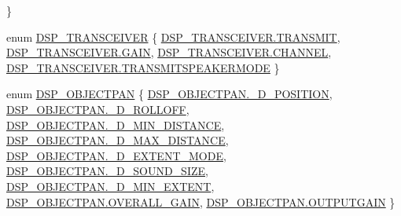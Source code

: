 \begin{DoxyCompactItemize}
 \}
\item 
enum \hyperlink{namespace_f_m_o_d_aefffa303a4100d6a80c39b52b7236a78}{D\+S\+P\+\_\+\+T\+R\+A\+N\+S\+C\+E\+I\+V\+ER} \{ \hyperlink{namespace_f_m_o_d_aefffa303a4100d6a80c39b52b7236a78a02d786cd0f7318c2533125f8b591abc5}{D\+S\+P\+\_\+\+T\+R\+A\+N\+S\+C\+E\+I\+V\+E\+R.\+T\+R\+A\+N\+S\+M\+IT}, 
\hyperlink{namespace_f_m_o_d_aefffa303a4100d6a80c39b52b7236a78a0803331e7c3fe03c1938ac408faaa0cc}{D\+S\+P\+\_\+\+T\+R\+A\+N\+S\+C\+E\+I\+V\+E\+R.\+G\+A\+IN}, 
\hyperlink{namespace_f_m_o_d_aefffa303a4100d6a80c39b52b7236a78af52e9c50a060add65a035429b2a22229}{D\+S\+P\+\_\+\+T\+R\+A\+N\+S\+C\+E\+I\+V\+E\+R.\+C\+H\+A\+N\+N\+EL}, 
\hyperlink{namespace_f_m_o_d_aefffa303a4100d6a80c39b52b7236a78a2baf55f61192ec0b636d26c23434146f}{D\+S\+P\+\_\+\+T\+R\+A\+N\+S\+C\+E\+I\+V\+E\+R.\+T\+R\+A\+N\+S\+M\+I\+T\+S\+P\+E\+A\+K\+E\+R\+M\+O\+DE}
 \}
\item 
enum \hyperlink{namespace_f_m_o_d_a95563ea7fc60d6954bd4b12f3d744b7e}{D\+S\+P\+\_\+\+O\+B\+J\+E\+C\+T\+P\+AN} \{ \newline
\hyperlink{namespace_f_m_o_d_a95563ea7fc60d6954bd4b12f3d744b7ea9723665080341a58cb6c48c247c7dcb3}{D\+S\+P\+\_\+\+O\+B\+J\+E\+C\+T\+P\+A\+N.\+\_\+D\+\_\+\+P\+O\+S\+I\+T\+I\+ON}, 
\hyperlink{namespace_f_m_o_d_a95563ea7fc60d6954bd4b12f3d744b7ea842c3e71ee04cbb163151d5905db4e5b}{D\+S\+P\+\_\+\+O\+B\+J\+E\+C\+T\+P\+A\+N.\+\_\+D\+\_\+\+R\+O\+L\+L\+O\+FF}, 
\hyperlink{namespace_f_m_o_d_a95563ea7fc60d6954bd4b12f3d744b7eaf1d2976e409d5210e6730050b505cf0a}{D\+S\+P\+\_\+\+O\+B\+J\+E\+C\+T\+P\+A\+N.\+\_\+D\+\_\+\+M\+I\+N\+\_\+\+D\+I\+S\+T\+A\+N\+CE}, 
\hyperlink{namespace_f_m_o_d_a95563ea7fc60d6954bd4b12f3d744b7ea9dcd71be7d6e694c4743ae08cff6fe56}{D\+S\+P\+\_\+\+O\+B\+J\+E\+C\+T\+P\+A\+N.\+\_\+D\+\_\+\+M\+A\+X\+\_\+\+D\+I\+S\+T\+A\+N\+CE}, 
\newline
\hyperlink{namespace_f_m_o_d_a95563ea7fc60d6954bd4b12f3d744b7eae7770be8f9cccaf1ae3cec69f6b462b8}{D\+S\+P\+\_\+\+O\+B\+J\+E\+C\+T\+P\+A\+N.\+\_\+D\+\_\+\+E\+X\+T\+E\+N\+T\+\_\+\+M\+O\+DE}, 
\hyperlink{namespace_f_m_o_d_a95563ea7fc60d6954bd4b12f3d744b7eaac78f52e2e5382a47d7dc103c7c532de}{D\+S\+P\+\_\+\+O\+B\+J\+E\+C\+T\+P\+A\+N.\+\_\+D\+\_\+\+S\+O\+U\+N\+D\+\_\+\+S\+I\+ZE}, 
\hyperlink{namespace_f_m_o_d_a95563ea7fc60d6954bd4b12f3d744b7ea2971af395b334030a5e4f75c1a7068e5}{D\+S\+P\+\_\+\+O\+B\+J\+E\+C\+T\+P\+A\+N.\+\_\+D\+\_\+\+M\+I\+N\+\_\+\+E\+X\+T\+E\+NT}, 
\hyperlink{namespace_f_m_o_d_a95563ea7fc60d6954bd4b12f3d744b7ea68f51ab78956ed19487f441db20eb3ff}{D\+S\+P\+\_\+\+O\+B\+J\+E\+C\+T\+P\+A\+N.\+O\+V\+E\+R\+A\+L\+L\+\_\+\+G\+A\+IN}, 
\newline
\hyperlink{namespace_f_m_o_d_a95563ea7fc60d6954bd4b12f3d744b7ea72a7062c4a0a71f1a633ae18e30b52f8}{D\+S\+P\+\_\+\+O\+B\+J\+E\+C\+T\+P\+A\+N.\+O\+U\+T\+P\+U\+T\+G\+A\+IN}
 \}
\end{DoxyCompactItemize}
